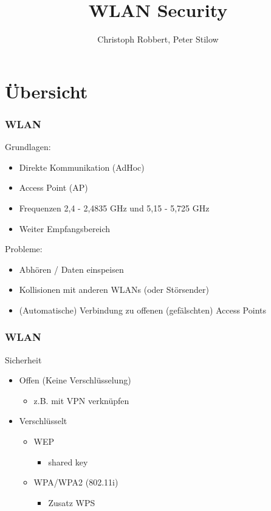 \documentclass{beamer}
\author[C.Robbert, P. Stilow]{Christoph Robbert, Peter Stilow}
\institute[Uni Paderborn]{Universität Paderborn}
\title[WLAN Security]{WLAN Security}
\begin{document}
\begin{frame}
\maketitle
\end{frame}

\section{Übersicht}
\begin{frame}
\frametitle{WLAN}
Grundlagen:
\begin{itemize}
	\item Direkte Kommunikation (AdHoc)
	\item Access Point (AP)
	\item Frequenzen 2,4 - 2,4835 GHz und 5,15 - 5,725 GHz
	\item Weiter Empfangsbereich
\end{itemize}
Probleme:
\begin{itemize}
	\item Abhören / Daten einspeisen
	\item Kollisionen mit anderen WLANs (oder Störsender)
	\item (Automatische) Verbindung zu offenen (gefälschten) Access Points
\end{itemize}
\end{frame}

\begin{frame}
\frametitle{WLAN}
Sicherheit
\begin{itemize}
	\item Offen (Keine Verschlüsselung)
	\begin{itemize}
		\item z.B. mit VPN verknüpfen
	\end{itemize}
	\item Verschlüsselt
	\begin{itemize}
		\item WEP
		\begin{itemize}
			\item shared key
		\end{itemize}
		\item WPA/WPA2 (802.11i)
		\begin{itemize}
			\item Zusatz WPS
		\end{itemize}
	\end{itemize}
\end{itemize}
\end{frame}
\end{document}
